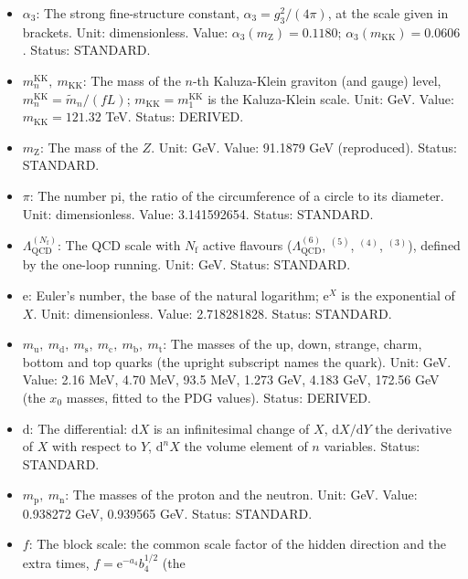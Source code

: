 \documentclass[
  10pt,
]{article}
\providecommand{\tightlist}{%
  \setlength{\itemsep}{0pt}\setlength{\parskip}{0pt}}
\begin{document}
\begin{itemize}
\tightlist
\item
  \(\alpha_3\): The strong fine-structure constant,
  \(\alpha_3 = g_3^2/(4\pi)\), at the scale given in brackets. Unit:
  dimensionless. Value: \(\alpha_3(m_{\mathrm{Z}}) = 0.1180\);
  \(\alpha_3(m_{\mathrm{KK}}) = 0.0606\). Status: STANDARD.
\item
  \(m^{\mathrm{KK}}_n,\ m_{\mathrm{KK}}\): The mass of the \(n\)-th
  Kaluza-Klein graviton (and gauge) level,
  \(m^{\mathrm{KK}}_n = \tilde m_n/(fL)\);
  \(m_{\mathrm{KK}} = m^{\mathrm{KK}}_1\) is the Kaluza-Klein scale.
  Unit: GeV. Value: \(m_{\mathrm{KK}} = 121.32\) TeV. Status: DERIVED.
\item
  \(m_{\mathrm{Z}}\): The mass of the \(Z\). Unit: GeV. Value: 91.1879
  GeV (reproduced). Status: STANDARD.
\item
  \(\pi\): The number pi, the ratio of the circumference of a circle to
  its diameter. Unit: dimensionless. Value: 3.141592654. Status:
  STANDARD.
\item
  \(\Lambda_{\mathrm{QCD}}^{(N_{\mathrm{f}})}\): The QCD scale with
  \(N_{\mathrm{f}}\) active flavours (\(\Lambda_{\mathrm{QCD}}^{(6)}\),
  \(^{(5)}\), \(^{(4)}\), \(^{(3)}\)), defined by the one-loop running.
  Unit: GeV. Status: STANDARD.
\item
  \(\mathrm{e}\): Euler's number, the base of the natural logarithm;
  \(\mathrm{e}^{X}\) is the exponential of \(X\). Unit: dimensionless.
  Value: 2.718281828. Status: STANDARD.
\item
  \(m_{\mathrm{u}},\ m_{\mathrm{d}},\ m_{\mathrm{s}},\ m_{\mathrm{c}},\ m_{\mathrm{b}},\ m_{\mathrm{t}}\):
  The masses of the up, down, strange, charm, bottom and top quarks (the
  upright subscript names the quark). Unit: GeV. Value: 2.16 MeV, 4.70
  MeV, 93.5 MeV, 1.273 GeV, 4.183 GeV, 172.56 GeV (the \(x_0\) masses,
  fitted to the PDG values). Status: DERIVED.
\item
  \(\mathrm{d}\): The differential: \(\mathrm{d}X\) is an infinitesimal
  change of \(X\), \(\mathrm{d}X/\mathrm{d}Y\) the derivative of \(X\)
  with respect to \(Y\), \(\mathrm{d}^nX\) the volume element of \(n\)
  variables. Status: STANDARD.
\item
  \(m_{\mathrm{p}},\ m_{\mathrm{n}}\): The masses of the proton and the
  neutron. Unit: GeV. Value: 0.938272 GeV, 0.939565 GeV. Status:
  STANDARD.
\item
  \(f\): The block scale: the common scale factor of the hidden
  direction and the extra times, \(f = \mathrm{e}^{-a_4}b_4^{1/2}\) (the

\end{itemize}
\end{document}
